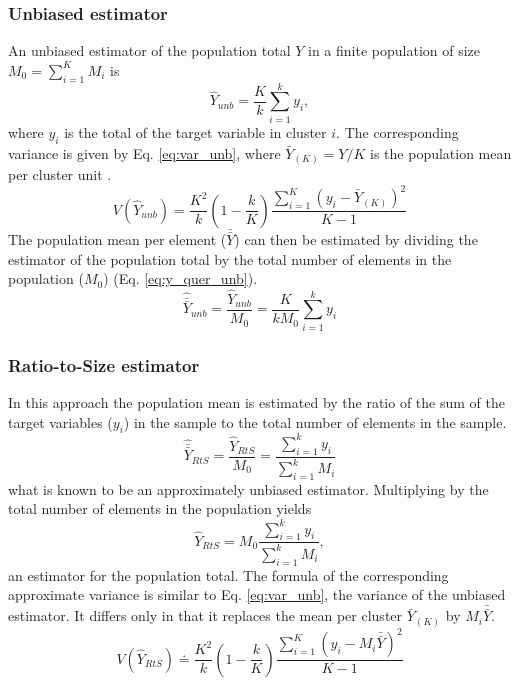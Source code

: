 \subsubsection{Unbiased estimator}
An unbiased estimator of the population total $Y$ in a finite population of size $M_0=\sum_{i=1}^K M_i$ is
\begin{equation}
 \hat{Y}_{unb}=\frac{K}{k}\sum_{i=1}^k y_i,
\label{eq:y_unb}
\end{equation}
 where $y_i$ is the total of the target variable in cluster $i$. The corresponding variance is given by Eq. \ref{eq:var_unb}, where $\bar{Y}_{(K)}=Y/K$ is the population mean per cluster unit \citep{Cochran_1977}.
\begin{equation}
 V\left(\hat{Y}_{unb}\right)=\frac{K^2}{k}\left(1-\frac{k}{K}\right)\frac{\sum_{i=1}^K\left(y_i-\bar{Y}_{(K)}\right)^2}{K-1}
\label{eq:var_unb}
\end{equation}
The population mean per element ($\bar{\bar{Y}}$) can then be estimated by dividing the estimator of the population total by the total number of elements in the population ($M_0$) (Eq. \ref{eq:y_quer_unb}).
\begin{equation}
\hat{\bar{\bar{Y}}}_{unb}=\frac{\hat{Y}_{unb}}{M_0}=\frac{K}{kM_0}\sum_{i=1}^k y_i
\label{eq:y_quer_unb}
\end{equation}
\subsubsection{Ratio-to-Size estimator}
In this approach the population mean is estimated by the ratio of the sum of the target variables ($y_i$) in the sample to the total number of elements in the sample. 
\begin{equation}
\hat{\bar{\bar{Y}}}_{RtS}=\frac{\hat{Y}_{RtS}}{M_0}=\frac{\sum_{i=1}^k y_i}{\sum_{i=1}^k M_i}
\label{eq:y_quer_rtos}
\end{equation}
what is known to be an approximately unbiased estimator. Multiplying by the total number of elements in the population yields
\begin{equation}
 \hat{Y}_{RtS}=M_0\frac{\sum_{i=1}^k y_i}{\sum_{i=1}^k M_i},
\label{eq:y_rtos}
\end{equation}
an estimator for the population total. The formula of the corresponding approximate variance is similar to Eq. \ref{eq:var_unb}, the variance of the unbiased estimator. It differs only in that it replaces the mean per cluster $\bar{Y}_{(K)}$ by $M_i \bar{\bar{Y}}$.
\begin{equation}
 V\left(\hat{Y}_{RtS}\right)\doteq\frac{K^2}{k}\left(1-\frac{k}{K}\right)\frac{\sum_{i=1}^K\left(y_i-M_i\bar{\bar{Y}}\right)^2}{K-1} 
\label{eq:var_rtos}
\end{equation}
